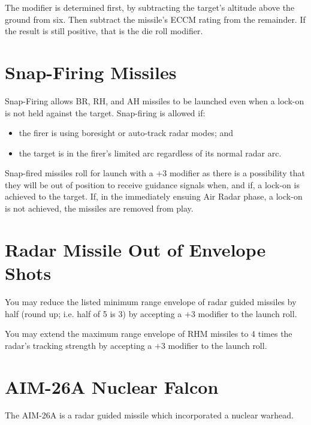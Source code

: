 The modifier is determined first, by subtracting the target's altitude above the ground from six. Then subtract the missile's ECCM rating from the remainder. If the result is still positive, that is the die roll modifier.


\begin{advancedrules}

\section{Snap-Firing Missiles}

Snap-Firing allows BR, RH, and AH missiles to be launched even when a lock-on is not held against the target. Snap-firing is allowed if:

\begin{itemize}
    \item the firer is using boresight or auto-track radar modes; and
    \item the target is in the firer's limited arc regardless of its normal radar arc.
\end{itemize}

Snap-fired missiles roll for launch with a $+3$ modifier as there is a possibility that they will be out of position to receive guidance signals when, and if, a lock-on is achieved to the target. If, in the immediately ensuing Air Radar phase, a lock-on is not achieved, the missiles are removed from play.

\section{Radar Missile Out of Envelope Shots}

You may reduce the listed minimum range envelope of radar guided missiles by half (round up; i.e. half of 5 is 3) by accepting a $+3$ modifier to the launch roll.

You may extend the maximum range envelope of RHM missiles to 4 times the radar's tracking strength by accepting a $+3$ modifier to the launch roll.

\section{AIM-26A Nuclear Falcon}

The AIM-26A is a radar guided missile which incorporated a nuclear warhead.


\end{advancedrules}
